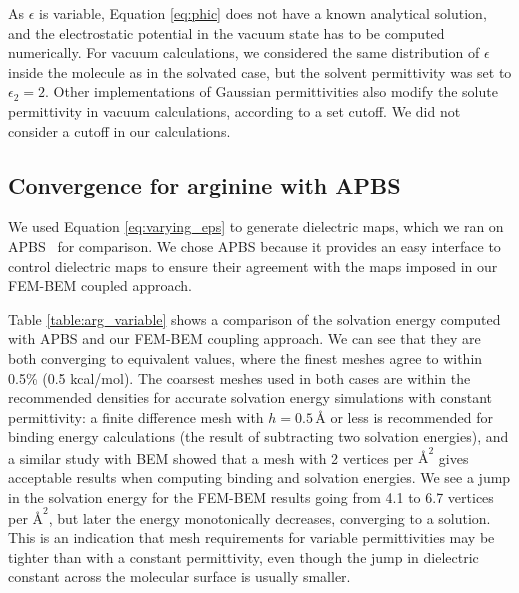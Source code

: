 As $\epsilon$ is variable, Equation \eqref{eq:phic} does not have a known analytical solution, and the electrostatic potential in the vacuum state has to be computed numerically.
For vacuum calculations, we considered the same distribution of $\epsilon$ inside the molecule as in the solvated case, but the solvent permittivity was set to $\epsilon_2=2$. 
Other implementations of Gaussian permittivities also modify the solute permittivity in vacuum calculations, according to a set cutoff.\cite{li2013dielectric} We did not consider a cutoff in our calculations.



\subsection*{\sffamily \large Convergence for arginine with APBS}

We used Equation \eqref{eq:varying_eps} to generate dielectric maps, which we ran on APBS~\cite{BakerETal2001} for comparison. 
We chose APBS because it provides an easy interface to control dielectric maps to ensure their agreement with the maps imposed in our FEM-BEM coupled approach.

Table \ref{table:arg_variable} shows a comparison of the solvation energy computed with APBS and our FEM-BEM coupling approach. We can see that they are both converging to equivalent values, where the finest meshes agree to within 0.5\% (0.5 kcal/mol). The coarsest meshes used in both cases are within the recommended densities for accurate solvation energy simulations with constant permittivity: a finite difference mesh with $h=0.5\,\text{\AA}$ or less is recommended for binding energy calculations\cite{sorensen2015comprehensive} (the result of subtracting two solvation energies), and a similar study with BEM\cite{CooperBardhanBarba2014} showed that a mesh with 2 vertices per $\text{\AA}^2$ gives acceptable results when computing binding and solvation energies. We see a jump in the solvation energy for the FEM-BEM results going from 4.1 to 6.7 vertices per $\text{\AA}^2$, but later the energy monotonically decreases, converging to a solution. This is an indication that mesh requirements for variable permittivities may be tighter than with a constant permittivity, even though the jump in dielectric constant across the molecular surface is usually smaller. 

